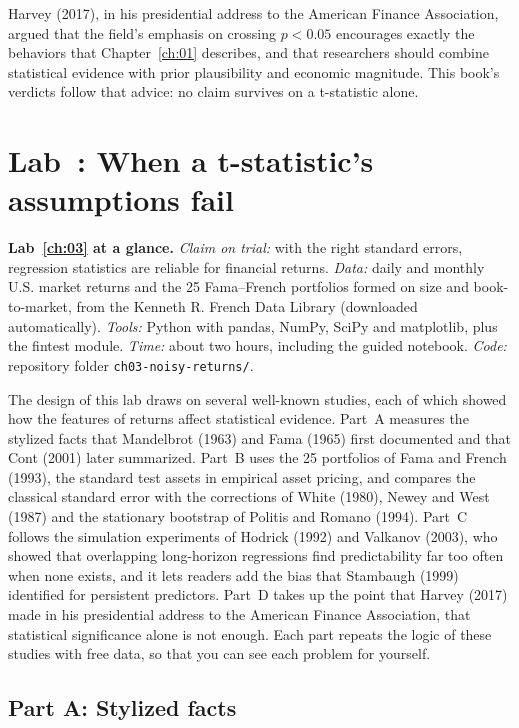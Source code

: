 Harvey (2017), in his presidential address to the American Finance Association, argued that the field's emphasis on crossing $p < 0.05$ encourages exactly the behaviors that Chapter~\ref{ch:01} describes, and that researchers should combine statistical evidence with prior plausibility and economic magnitude. This book's verdicts follow that advice: no claim survives on a t-statistic alone.

\section{Lab~\thechapter: When a t-statistic's assumptions fail}
\label{sec:03-lab}

\begin{callout}
\textbf{Lab~\ref{ch:03} at a glance.} \emph{Claim on trial:} with the right standard errors, regression statistics are reliable for financial returns. \emph{Data:} daily and monthly U.S. market returns and the 25 Fama--French portfolios formed on size and book-to-market, from the Kenneth R. French Data Library (downloaded automatically). \emph{Tools:} Python with pandas, NumPy, SciPy and matplotlib, plus the fintest module. \emph{Time:} about two hours, including the guided notebook. \emph{Code:} repository folder \texttt{ch03-noisy-returns/}.
\end{callout}

The design of this lab draws on several well-known studies, each of which showed how the features of returns affect statistical evidence. Part~A measures the stylized facts that Mandelbrot (1963) and Fama (1965) first documented and that Cont (2001) later summarized. Part~B uses the 25 portfolios of Fama and French (1993), the standard test assets in empirical asset pricing, and compares the classical standard error with the corrections of White (1980), Newey and West (1987) and the stationary bootstrap of Politis and Romano (1994). Part~C follows the simulation experiments of Hodrick (1992) and Valkanov (2003), who showed that overlapping long-horizon regressions find predictability far too often when none exists, and it lets readers add the bias that Stambaugh (1999) identified for persistent predictors. Part~D takes up the point that Harvey (2017) made in his presidential address to the American Finance Association, that statistical significance alone is not enough. Each part repeats the logic of these studies with free data, so that you can see each problem for yourself.


\subsection*{Part A: Stylized facts}

